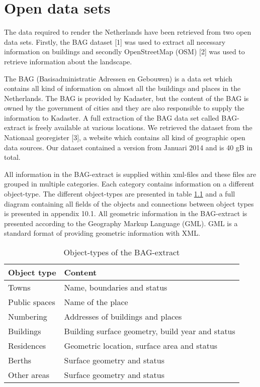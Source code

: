 \chapter{Open data sets}
The data required to render the Netherlands have been retrieved from two open data sets. Firstly, the BAG dataset [1] was used to extract all necessary information on buildings and secondly OpenStreetMap (OSM) [2] was used to retrieve information about the landscape.

The BAG (Basisadministratie Adressen en Gebouwen) is a data set which contains all kind of information on almost all the buildings and places in the Netherlands. The BAG is provided by Kadaster, but the content of the BAG is owned by the government of cities and they are also responsible to supply the information to Kadaster. A full extraction of the BAG data set called BAG-extract is freely available at various locations. We retrieved the dataset from the Nationaal georegister [3], a website which contains all kind of geographic open data sources. Our dataset contained a version from Januari 2014 and is 40 gB in total.

All information in the BAG-extract is supplied within xml-files and these files are grouped in multiple categories. Each category contains information on a different object-type. The different object-types are presented in table \ref{Table:ObjectTypesBAG} and a full diagram containing all fields of the objects and connections between object types is presented in appendix 10.1. All geometric information in the BAG-extract is presented according to the Geography Markup Language (GML). GML is a standard format of providing geometric information with XML.

\begin{table}
    \begin{tabular}{l|l}
      \textbf{Object type} & \textbf{Content}     \\ \hline
      Towns & Name, boundaries and status  \\ \hline
      Public spaces & Name of the place  \\ \hline
      Numbering & Addresses of buildings and places  \\ \hline
      Buildings & Building surface geometry, build year and status  \\ \hline 
      Residences & Geometric location, surface area and status  \\ \hline
      Berths & Surface geometry and status  \\ \hline
      Other areas & Surface geometry and status \\
    \end{tabular}
    \caption{Object-types of the BAG-extract}
    \label{Table:ObjectTypesBAG}
\end{table}


